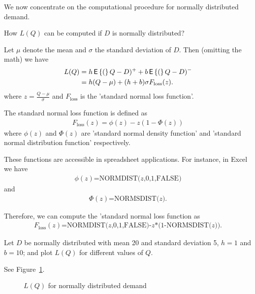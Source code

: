 We now concentrate on the computational procedure for normally distributed demand. 

\begin{question}
How $L(Q)$ can be computed if $D$ is normally distributed?
\end{question}

\begin{solution}
Let $\mu$ denote the mean and $\sigma$ the standard deviation of $D$. Then (omitting the math) we have
\begin{align*}
L(Q) 
& = h \,\mathsf{E}\left\{(\right\}Q-D)^+ + b \,\mathsf{E}\left\{(\right\}Q-D)^- \\
& = h(Q-\mu) + (h+b) \sigma F_{\text{loss}}(z).
\end{align*}
where $z=\frac{Q-\mu}{\sigma}$ and $F_{\text{loss}}$ is the 'standard normal loss function'. 

The standard normal loss function is defined as 
\begin{align*}
F_{\text{loss}}(z) = \phi(z)-z(1-\Phi(z))
\end{align*}
where $\phi(z)$ and $\Phi(z)$ are 'standard normal density function' and 'standard normal distribution function' respectively. 

These functions are accessible in spreadsheet applications. For instance, in Excel we have 
\begin{align*}
\phi(z) \text{=NORMDIST($z$,0,1,FALSE)}
\end{align*}
and
\begin{align*}
\Phi(z) \text{=NORMSDIST($z$)}.
\end{align*}

Therefore, we can compute the 'standard normal loss function as
\begin{align*}
F_{\text{loss}}(z) \text{=NORMDIST($z$,0,1,FALSE)-$z$*(1-NORMSDIST($z$))}.
\end{align*}
\end{solution}

\begin{question}\label{ex:nw_stoc}
Let $D$ be normally distributed with mean 20 and standard deviation 5, $h=1$ and $b=10$; and plot $L(Q)$ for different values of $Q$. 
\end{question}

\begin{solution}
See Figure~\ref{fig:LQ_normal}.

\begin{figure}[htbp]
\centering
{}
\caption{$L(Q)$ for normally distributed demand}
\label{fig:LQ_normal}
\end{figure}
\end{solution}


